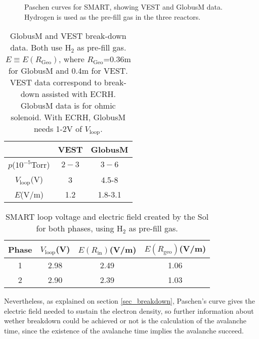 \documentclass[a4paper,12pt,oneside]{book}
\begin{document}
\begin{figure}[htbp]
\centering
{}
\hfill
{}

\caption{Paschen curves for SMART, showing VEST and GlobusM data. Hydrogen is used as the pre-fill gas in the three reactors.}
\label{fig_Paschen}
\end{figure}


\begin{table}
	\centering		
	\begin{tabular}{|c|c|c|} \hline
		& VEST & GlobusM \\ \hline
		$p$($10^{-5}$Torr) & $2-3$ &  $3-6$ \\ \hline
		$V_\text{loop}$(V) & 3 & 4.5-8 \\ \hline
		$E$(V/m) & 1.2 & 1.8-3.1 \\ \hline
	\end{tabular}
	\caption{GlobusM \cite{Globus_2001} and VEST \cite{VEST_2015} break-down data. Both use H$_2$ as pre-fill gas. $E \equiv E(R_\text{Geo})$, where $R_\text{Geo}$=0.36m for GlobusM and  0.4m for VEST. VEST data correspond to break-down assisted with ECRH. GlobusM data is for ohmic solenoid. With ECRH, GlobusM needs 1-2V of $V_\text{loop}$.}
	\label{tabla_Paschen_GlobusVEST}
\end{table}


\begin{table}[htbp]
\centering
	\begin{tabular}{|c|c|c|c|} \hline
Phase	 & $V_\text{loop}$(V) & $E(R_\text{in})$(V/m) & $E(R_\text{geo})$(V/m) \\ \hline
	1 & 2.98 & 2.49 & 1.06 \\ \hline
	2 & 2.90 & 2.39 & 1.03 \\ \hline
	\end{tabular}
	\caption{SMART loop voltage and electric field created by the Sol for both phases, using H$_2$ as pre-fill gas.}
\label{table_Paschen_SMART}
\end{table}

Nevertheless, as explained on section \ref{sec_breakdown}, Paschen's curve gives the electric field needed to sustain the electron density, so further information about wether breakdown could be achieved or not is the calculation of the avalanche time, since the existence of the avalanche time implies the avalanche succeed. 
\end{document}
